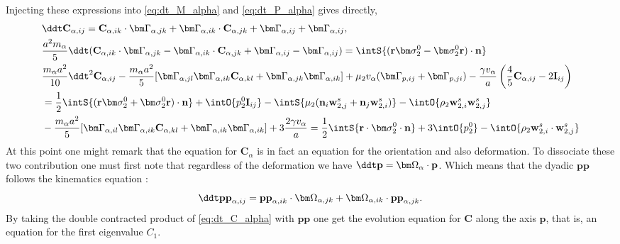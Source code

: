 Injecting these expressions into \ref{eq:dt_M_alpha} and \ref{eq:dt_P_alpha} gives directly, 
\begin{align}
    \label{eq:dt_C_alpha}
    &\ddt \textbf{C}_{\alpha,ij}
    = \textbf{C}_{\alpha,ik} \cdot \bm\Gamma_{\alpha,jk}
    +  \bm\Gamma_{\alpha,ik} \cdot \textbf{C}_{\alpha,jk}
    +  \bm\Gamma_{\alpha,ij} + \bm\Gamma_{\alpha,ij}
    ,\\
    &\frac{a^2  m_\alpha}{5} \ddt( 
        \textbf{C}_{\alpha,ik} \cdot \bm\Gamma_{\alpha,jk}
        -  \bm\Gamma_{\alpha,ik} \cdot \textbf{C}_{\alpha,jk}
        +  
        \bm\Gamma_{\alpha,ij} - \bm\Gamma_{\alpha,ij}
    )
    =  
    \intS{(\textbf{r}\bm\sigma_2^0- \bm\sigma_2^0\textbf{r})\cdot \textbf{n}}\\
    &\frac{m_\alpha a^2}{10}\ddt^2 \textbf{C}_{\alpha,ij}
    - \frac{m_\alpha a^2}{5}[
        \bm\Gamma_{\alpha,jl}\bm\Gamma_{\alpha,ik} \textbf{C}_{\alpha,kl} 
        + \bm\Gamma_{\alpha,jk}\bm\Gamma_{\alpha,ik} 
    ]
    + \mu_2 v_\alpha (\bm \Gamma_{p,ij}+\bm \Gamma_{p,ji})
    - \frac{ \gamma v_\alpha }{ a} \left(\frac{4}{5}
        \textbf{C}_{\alpha,ij}
        -2 \textbf{I}_{ij}
    \right)\nonumber\\
    &= \frac{1}{2}\intS{(\textbf{r}\bm\sigma_2^0+ \bm\sigma_2^0\textbf{r})\cdot \textbf{n}}
    + \intO{p_2^0 \textbf{I}_{ij}}
    - \intS{\mu_2 (\textbf{n}_i \textbf{w}_{2,j}^s + \textbf{n}_j \textbf{w}_{2,i}^s)}
    - \intO{\rho_2 \textbf{w}_{2,i}^s\textbf{w}_{2,j}^s} \\
    &- \frac{m_\alpha a^2}{5}[
        \bm\Gamma_{\alpha,il}\bm\Gamma_{\alpha,ik} \textbf{C}_{\alpha,kl} 
        + \bm\Gamma_{\alpha,ik}\bm\Gamma_{\alpha,ik} 
    ]
    + 3 \frac{ 2 \gamma v_\alpha }{ a} 
= \frac{1}{2}\intS{\textbf{r}\cdot \bm\sigma_2^0\cdot \textbf{n}}
    + 3 \intO{p_2^0 }
    - \intO{\rho_2 \textbf{w}_{2,i}^s\cdot\textbf{w}_{2,j}^s} 
\end{align}
At this point one might remark that the equation for $\textbf{C}_\alpha$ is in fact an equation for the orientation and also deformation. 
To dissociate these two contribution one must first note that regardless of the deformation we have $\ddt \textbf{p} = \bm\Omega_\alpha \cdot \textbf{p}$.
Which means that the dyadic $\textbf{pp}$ follows the kinematics   equation :
\begin{equation*}
    \ddt \textbf{pp}_{\alpha,ij}
    =  \textbf{pp}_{\alpha,ik} \cdot \bm\Omega_{\alpha,jk}
    +  \bm\Omega_{\alpha,ik} \cdot \textbf{pp}_{\alpha,jk}.
\end{equation*}
By taking the double contracted product of \ref{eq:dt_C_alpha} with $\textbf{pp}$ one get the evolution equation for $\textbf{C}$ along the axis $\textbf{p}$, that is, an equation for the first eigenvalue $C_1$.
